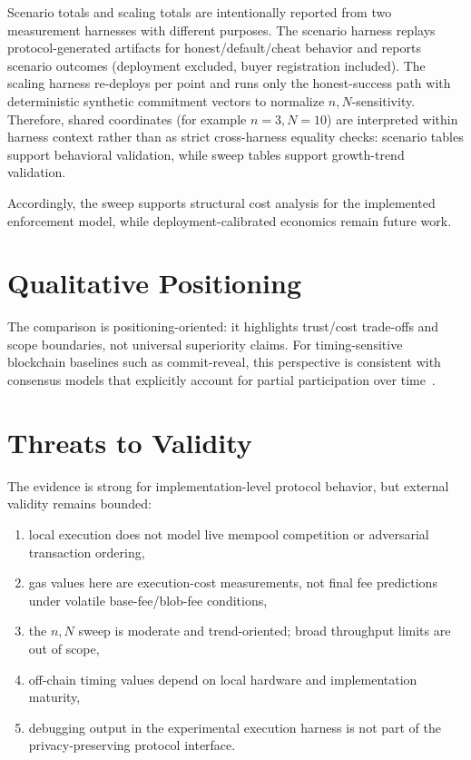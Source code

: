 \documentclass[final,twoside]{vutinfth}
\begin{document}
Scenario totals and scaling totals are intentionally reported from two
measurement harnesses with different purposes.
The scenario harness replays protocol-generated artifacts for
honest/default/cheat behavior and reports scenario outcomes (deployment
excluded, buyer registration included).
The scaling harness re-deploys per point and runs only the honest-success path
with deterministic synthetic commitment vectors to normalize
\(n,N\)-sensitivity.
Therefore, shared coordinates (for example \(n=3, N=10\)) are interpreted
within harness context rather than as strict cross-harness equality checks:
scenario tables support behavioral validation, while sweep tables support
growth-trend validation.

Accordingly, the sweep supports structural cost analysis for the implemented
enforcement model, while deployment-calibrated economics remain future work.

\section{Qualitative Positioning}


The comparison is positioning-oriented: it highlights trust/cost trade-offs and
scope boundaries, not universal superiority claims.
For timing-sensitive blockchain baselines such as commit-reveal, this perspective is consistent with consensus models that explicitly account for partial participation over time~\cite{PassShi2017Sleepy}.
\clearpage

\section{Threats to Validity}
The evidence is strong for implementation-level protocol behavior, but external
validity remains bounded:
\begin{enumerate}
\item local execution does not model live mempool competition or adversarial
transaction ordering,
\item gas values here are execution-cost measurements, not final fee
predictions under volatile base-fee/blob-fee conditions,
\item the \(n,N\) sweep is moderate and trend-oriented; broad throughput limits
are out of scope,
\item off-chain timing values depend on local hardware and implementation
maturity,
\item debugging output in the experimental execution harness is not part of the
privacy-preserving protocol interface.
\end{enumerate}
\end{document}
